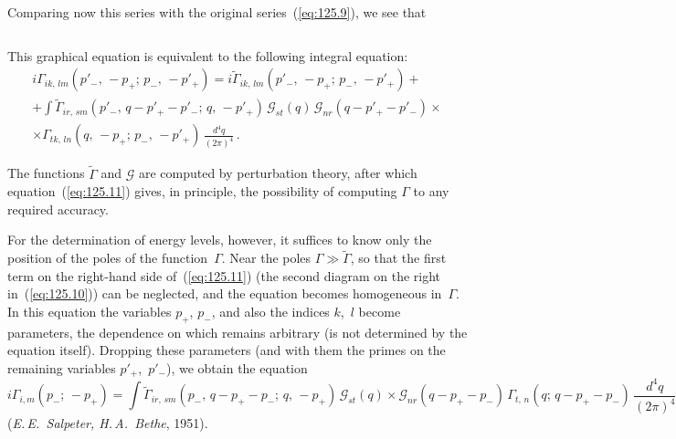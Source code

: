 

Comparing now this series with the original series~(\ref{eq:125.9}), we see that


\begin{equation}
\label{eq:125.10}
\end{equation}

This graphical equation is equivalent to the following integral equation:
\begin{multline}
i\Gamma_{ik,\,lm}(p'_-,\,-p_+;\,p_-,\,-p'_+) = i\widetilde{\Gamma}_{ik,\,lm}(p'_-,\,-p_+;\,p_-,\,-p'_+) + {} \\
+ \int \widetilde{\Gamma}_{ir,\,sm}(p'_-,\,q - p'_+ - p'_-;\,q,\,-p'_+)\,\mathcal{G}_{st}(q)\,\mathcal{G}_{nr}(q - p'_+ - p'_-) \times {} \\
\times \Gamma_{tk,\,ln}(q,\,-p_+;\,p_-,\,-p'_+)\,\frac{d^4 q}{(2\pi)^4}\,.
\label{eq:125.11}
\end{multline}

The functions $\widetilde{\Gamma}$ and $\mathcal{G}$ are computed by perturbation theory, after which equation~(\ref{eq:125.11}) gives, in principle, the possibility of computing $\Gamma$ to any required accuracy.

For the determination of energy levels, however, it suffices to know only the position of the poles of the function~$\Gamma$. Near the poles $\Gamma \gg \widetilde{\Gamma}$, so that the first term on the right-hand side of~(\ref{eq:125.11}) (the second diagram on the right in~(\ref{eq:125.10})) can be neglected, and the equation becomes homogeneous in~$\Gamma$. In this equation the variables $p_+$, $p_-$, and also the indices $k$,~$l$ become parameters, the dependence on which remains arbitrary (is not determined by the equation itself). Dropping these parameters (and with them the primes on the remaining variables $p'_+$,~$p'_-$), we obtain the equation
\begin{equation}
i\Gamma_{i,m}(p_-;\,-p_+) = \int \widetilde{\Gamma}_{ir,\,sm}(p_-,\,q - p_+ - p_-;\,q,\,-p_+)\,\mathcal{G}_{st}(q) \times \mathcal{G}_{nr}(q - p_+ - p_-)\,\Gamma_{t,\,n}(q;\,q - p_+ - p_-)\,\frac{d^4 q}{(2\pi)^4}
\label{eq:125.12}
\end{equation}
(\textit{E.\,E.~Salpeter, H.\,A.~Bethe}, 1951).

